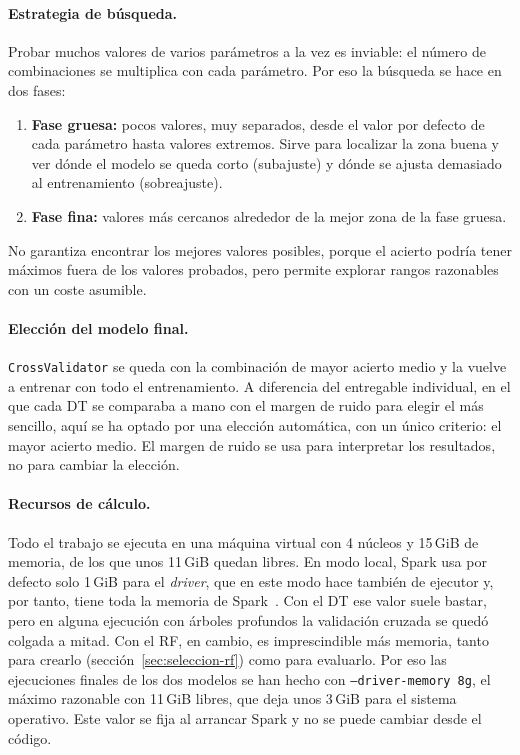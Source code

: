 \documentclass[12pt,a4paper]{article}
\begin{document}
\paragraph{Estrategia de búsqueda.} Probar muchos valores de varios
parámetros a la vez es inviable: el número de combinaciones se multiplica
con cada parámetro. Por eso la búsqueda se hace en dos fases:
\begin{enumerate}
    \item \textbf{Fase gruesa:} pocos valores, muy separados, desde el valor
    por defecto de cada parámetro hasta valores extremos. Sirve para
    localizar la zona buena y ver dónde el modelo se queda corto
    (subajuste) y dónde se ajusta demasiado al entrenamiento
    (sobreajuste).
    \item \textbf{Fase fina:} valores más cercanos alrededor de la mejor
    zona de la fase gruesa.
\end{enumerate}
No garantiza encontrar los mejores valores posibles, porque el acierto
podría tener máximos fuera de los valores probados, pero permite explorar
rangos razonables con un coste asumible.
 
\paragraph{Elección del modelo final.} \texttt{CrossValidator} se queda
con la combinación de mayor acierto medio y la vuelve a entrenar con todo
el entrenamiento. A diferencia del entregable individual, en el que cada
\ac{DT} se comparaba a mano con el margen de ruido para elegir el más
sencillo, aquí se ha optado por una elección automática, con un único
criterio: el mayor acierto medio. El margen de ruido se usa para
interpretar los resultados, no para cambiar la elección.

\paragraph{Recursos de cálculo.} Todo el trabajo se ejecuta en una máquina
virtual con 4 núcleos y 15\,GiB de memoria, de los que unos 11\,GiB quedan
libres. En modo local, Spark usa por defecto solo 1\,GiB para el
\textit{driver}, que en este modo hace también de ejecutor y, por tanto,
tiene toda la memoria de Spark~\cite{spark_configuracion}. Con el \ac{DT}
ese valor suele bastar, pero en alguna ejecución con árboles profundos la
validación cruzada se quedó colgada a mitad. Con el \ac{RF}, en cambio, es imprescindible más memoria, tanto para
crearlo (sección~\ref{sec:seleccion-rf}) como para evaluarlo. Por eso
las ejecuciones finales de los dos modelos se han hecho con
\texttt{--driver-memory 8g}, el máximo razonable con 11\,GiB libres, que
deja unos 3\,GiB para el sistema operativo. Este valor se fija al arrancar
Spark y no se puede cambiar desde el código.
 
\end{document}
